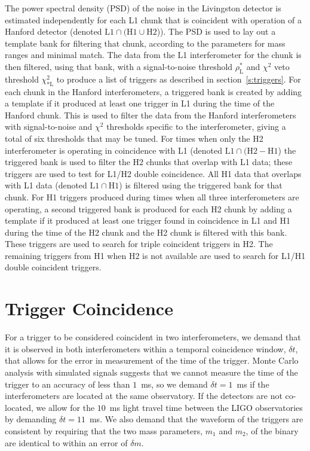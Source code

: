 The power spectral density (PSD) of the noise in the Livingston detector is
estimated independently for each L1 chunk that is coincident with operation of
a Hanford detector (denoted $\mathrm{L1} \cap (\mathrm{H1} \cup
\mathrm{H2}$)).  The PSD is used to lay out a template bank for filtering that
chunk, according to the parameters for mass ranges and minimal
match\cite{Owen:1998dk}. The data from the L1 interferometer for the chunk is
then filtered, using that bank, with a signal-to-noise threshold
$\rho_{\mathrm{L}}^\ast$ and $\chi^2$ veto threshold
$\chi^2_{\ast\mathrm{L}}$ to produce a list of triggers as described in
section~\ref{s:triggers}.  For each chunk in the Hanford interferometers, a
{triggered bank} is created by adding a template if it produced at least one
trigger in L1 during the time of the Hanford chunk.  This is used to filter
the data from the Hanford interferometers with signal-to-noise and $\chi^2$
thresholds specific to the interferometer, giving a total of six thresholds
that may be tuned.  For times when only the H2 interferometer is operating in
coincidence with L1 (denoted $\mathrm{L1} \cap (\mathrm{H2} - \mathrm{H1}$)
the triggered bank is used to filter the H2 chunks that overlap with L1 data;
these triggers are used to test for L1/H2 double coincidence.  All H1 data
that overlaps with L1 data (denoted $\mathrm{L1} \cap \mathrm{H1}$) is
filtered using the triggered bank for that chunk. For H1 triggers produced
during times when all three interferometers are operating, a second triggered
bank is produced for each H2 chunk by adding a template if it produced at
least one trigger found in coincidence in L1 and H1 during the time of the H2
chunk and the H2 chunk is filtered with this bank.  These triggers are used to
search for triple coincident triggers in H2.  The remaining triggers from H1
when H2 is not available are used to search for L1/H1 double coincident
triggers.


\section{Trigger Coincidence}
\label{s:coincidence}

For a trigger to be considered coincident in two interferometers, we demand
that it is observed in both interferometers within a temporal coincidence
window, $\delta t$, that allows for the error in measurement of the time of the trigger. Monte Carlo analysis with simulated signals suggests that we
cannot measure the time of the trigger to an accuracy of less than $1$~ms, so
we demand $\delta t = 1$~ms if the interferometers are located at the same
observatory. If the detectors are not co-located, we allow for the $10$~ms
light travel time between the LIGO observatories by demanding $\delta t =
11$~ms. We also demand that the waveform of the triggers are consistent by
requiring that the two mass parameters, $m_1$ and $m_2$, of the binary are
identical to within an error of $\delta m$.


